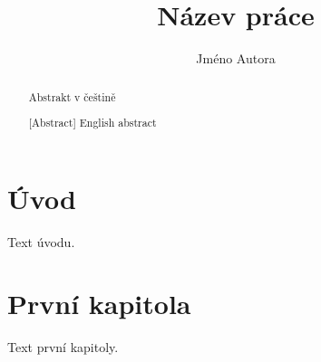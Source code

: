 \documentclass[oneside,a4paper,12pt]{book}
\author{Jméno Autora}
\title{Název práce}
\begin{document}
\frontmatter
\TitlePage
{}

\begin{abstract}
Abstrakt v češtině
\SavedKeywords %
\end{abstract}

\begin{abstract}[Abstract]
English abstract
\end{abstract}

\tableofcontents
\chapter{Úvod}
Text úvodu.

\mainmatter
\chapter{První kapitola}
Text první kapitoly.
\end{document}
